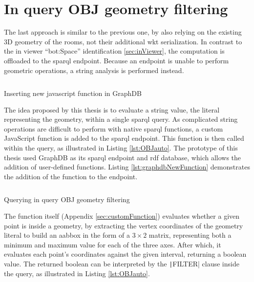 \section{In query OBJ geometry filtering} \label{sec:inQuery}
The last approach is similar to the previous one, by also relying on the existing 3D geometry of the rooms, not their additional \ac{wkt} serialization. In contrast to the in viewer \enquote{bot:Space} identification \ref{sec:inViewer}, the computation is offloaded to the \ac{sparql} endpoint. Because an endpoint is unable to perform geometric operations, a string analysis is performed instead.

\begin{listing}[H]
    \inputminted{sparql}{dynamicQueries/inQuery/insert.rq}
    \vspace{-0.7cm}
    \caption{Inserting new javascript function in GraphDB}
    \label{lst:graphdbNewFunction}
\end{listing}

The idea proposed by this thesis is to evaluate a string value, the literal representing the geometry, within a single \ac{sparql} query. As complicated string operations are difficult to perform with native \ac{sparql} functions, a custom JavaScript function is added to the \ac{sparql} endpoint. This function is then called within the query, as illustrated in Listing \ref{lst:OBJauto}. The prototype of this thesis used GraphDB as its \ac{sparql} endpoint and \ac{rdf} database, which allows the addition of user-defined functions. Listing \ref{lst:graphdbNewFunction} demonstrates the addition of the function to the endpoint.

\begin{listing}[H]
    \inputminted{sparql}{dynamicQueries/inQuery/query.rq}
    \vspace{-0.7cm}
    \caption{Querying in query OBJ geometry filtering}
    \label{lst:OBJauto}
\end{listing}

The function itself (Appendix \ref{sec:customFunction}) evaluates whether a given point is inside a geometry, by extracting the vertex coordinates of the geometry literal to build an \ac{aabbox} in the form of a $3\times2$ matrix, representing both a minimum and maximum value for each of the three axes. After which, it evaluates each point's coordinates against the given interval, returning a boolean value. The returned boolean can be interpreted by the \texttt|FILTER| clause inside the query, as illustrated in Listing \ref{lst:OBJauto}.

